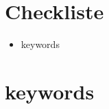 \documentclass[fleqn,parskip=half]{scrreprt} %
\begin{document}
	
	
	\ifisbook\cleardoubleemptypage\fi
	\tableofcontents
	\cleardoublepage

	
	\chapter{Checkliste}
	\begin{itemize}[label=\checkmark] \itemsep -2pt
		\item keywords   
	\end{itemize}
	





	\chapter{keywords}
	



	\ifisbook\cleardoubleemptypage\fi
	\printbibliography
	
\end{document}
